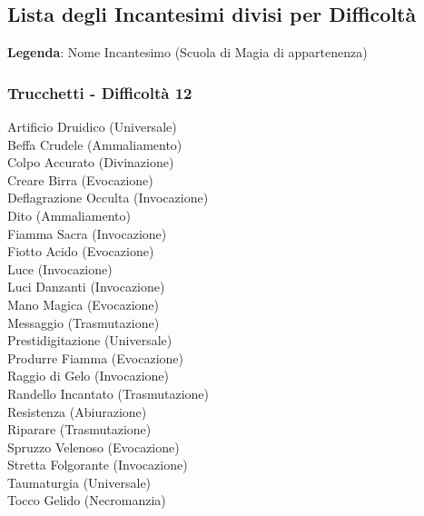 \pagebreak

\begin{multicols}{3}
	
	
	\subsection{Lista degli Incantesimi divisi per Difficoltà}
	
	\textbf{Legenda}: Nome Incantesimo (Scuola di Magia di appartenenza)\\
	
	\subsubsection{Trucchetti - Difficoltà 12}
	Artificio Druidico (Universale)\\
	Beffa Crudele (Ammaliamento)\\
	Colpo Accurato (Divinazione)\\
	Creare Birra (Evocazione)\\
	Deflagrazione Occulta (Invocazione)\\
	Dito (Ammaliamento)\\
	Fiamma Sacra (Invocazione)\\
	Fiotto Acido (Evocazione)\\
	Luce (Invocazione)\\
	Luci Danzanti (Invocazione)\\
	Mano Magica (Evocazione)\\
	Messaggio (Trasmutazione)\\
	Prestidigitazione (Universale)\\
	Produrre Fiamma (Evocazione)\\
	Raggio di Gelo (Invocazione)\\
	Randello Incantato (Trasmutazione)\\
	Resistenza (Abiurazione)\\
	Riparare (Trasmutazione)\\
	Spruzzo Velenoso (Evocazione)\\
	Stretta Folgorante (Invocazione)\\
	Taumaturgia (Universale)\\
	Tocco Gelido (Necromanzia)\\
	

\end{multicols}
